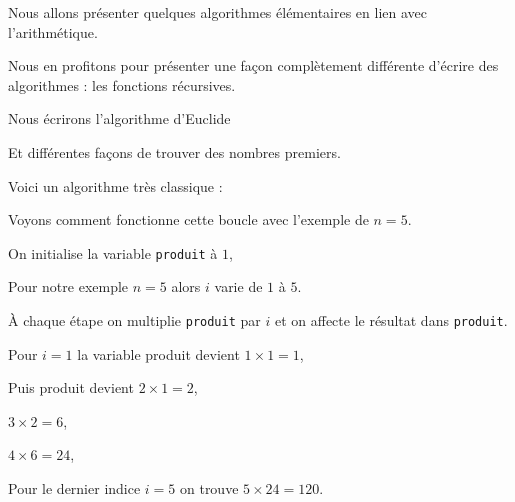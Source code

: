 


\newcommand{\codeinline}[1]{\texttt{#1}}





\debuttexte

\diapo

\change

Nous allons présenter quelques algorithmes élémentaires en lien avec l'arithmétique.

\change

Nous en profitons pour présenter une façon complètement différente d'écrire des algorithmes :
les fonctions récursives.

\change

Nous écrirons l'algorithme d'Euclide

\change

Et différentes façons de trouver des nombres premiers.



\diapo

Voici un algorithme très classique :

\change

Voyons comment fonctionne cette boucle avec l'exemple de $n=5$.

\change

On initialise la variable \codeinline{produit} à $1$,


Pour notre exemple $n=5$ alors $i$ varie de $1$ à $5$.

\`A chaque étape on multiplie \codeinline{produit}
par $i$ et on affecte le résultat dans \codeinline{produit}. 

\change

Pour $i=1$ la variable produit devient
$1 \times 1 = 1$, 

\change

Puis produit devient $2 \times 1 = 2$, 

\change


$3 \times 2 = 6$, 

\change

$4\times 6 = 24$, 

\change

Pour le dernier indice $i=5$ on trouve
$5 \times 24 = 120$.

